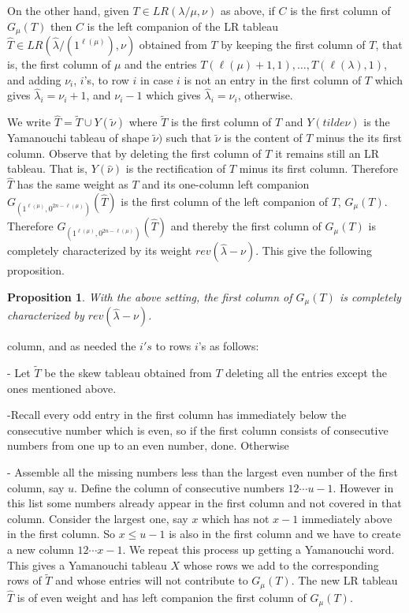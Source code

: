 \documentclass[reqno]{amsart}
\theoremstyle{tplain}
\newtheorem{prop}{Proposition}
\begin{document}
{ On the other hand, given $T\in LR(\lambda/\mu,\nu)$ as above, if $C$ is the first column of $G_\mu(T)$ then $C$ is the left companion of the LR tableau $\widehat T\in LR(\widehat\lambda/(1^{\ell(\mu)}),\nu)$ obtained from $T$ by keeping the first column of $T$, that is, the first column of $\mu$ and the  entries $T(\ell(\mu)+1,1),\dots,T(\ell(\lambda),1)$, and adding
 $\nu_i$, $i$'s, to row $i$ in case $i$ is not an entry in the first column of $T$ which gives $\hat\lambda_i=\nu_i+1$, and $\nu_i-1$ which gives $\hat\lambda_i=\nu_i$,  otherwise.
  
  We write $\widehat T=\tilde T\cup Y(\tilde \nu)$ where $\tilde T$ is the first column of $T$ and  $Y(tilde \nu)$ is the Yamanouchi tableau of shape $\tilde \nu)$ such that $\tilde \nu$ is the content of $T$ minus the its first column. Observe that by deleting the first column of $T$ it remains still an LR tableau. That is,
  $Y(\hat \nu)$ is the rectification of $T$ minus its first column.
 Therefore $\widehat T$ has the same weight as $T$ and its one-column left companion $G_{(1^{\ell(\mu)},0^{2n-\ell(\mu)})}(\widehat T)$ is the first column of the left companion of $T$, $G_\mu(T)$. Therefore $G_{(1^{\ell(\mu)},0^{2n-\ell(\mu)})}(\widehat T)$ and thereby the first column of $G_\mu(T)$ is completely characterized by its weight $rev(\widehat \lambda-\nu)$. This give the following proposition.
 
 \begin{prop} With the above setting, the first column of $G_\mu(T)$ is completely characterized by $rev(\widehat\lambda-\nu)$.
 \end{prop}

 \iffalse
 column, and as needed the $i's$ to rows $i$'s as follows:

 - Let $\tilde T$ be the skew tableau  obtained from $T$ deleting all the entries except the ones mentioned above.

-Recall every odd entry in the first column has immediately below the consecutive number which is even, so if the first column consists of consecutive numbers from one up to an even number, done. Otherwise

- Assemble all the missing numbers less than the largest even number of the first column, say $u$.  Define the column of consecutive numbers $12\cdots u-1$. However in this list some numbers already appear in the first column and not covered in that column. Consider the largest one, say $x$ which has not $x-1$ immediately above in the first column. So  $x\le u-1$ is also in the first column and we have to create a new column $12\cdots x-1$. We repeat this process up getting a Yamanouchi word. This gives a Yamanouchi tableau $X$ whose rows we add to the corresponding rows of $\tilde T$ and whose entries  will not contribute to $G_\mu(T)$. The new LR tableau $\widehat T$ is of even weight and has left companion the first column of $G_\mu(T)$.

}
\end{document}
